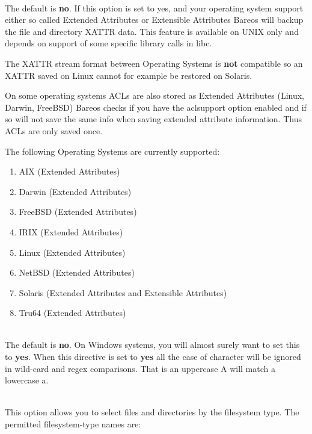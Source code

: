 \begin{description}
\label{XattrSupport}
\item [xattrsupport=yes{\textbar}no] \hfill \\
   The default is {\bf no}.  If this option is set to yes, and your
   operating system support either so called Extended Attributes or
   Extensible Attributes Bareos will backup the file and directory
   XATTR data. This feature is available on UNIX only and depends on
   support of some specific library calls in libc.

   The XATTR stream format between Operating Systems is {\bf not}
   compatible so an XATTR saved on Linux cannot for example be restored
   on Solaris.

   On some operating systems ACLs are also stored as Extended Attributes
   (Linux, Darwin, FreeBSD) Bareos checks if you have the aclsupport
   option enabled and if so will not save the same info when saving
   extended attribute information. Thus ACLs are only saved once.

   The following Operating Systems are currently supported:

   \begin{enumerate}
   \item AIX (Extended Attributes)
   \item Darwin (Extended Attributes)
   \item FreeBSD (Extended Attributes)
   \item IRIX (Extended Attributes)
   \item Linux (Extended Attributes)
   \item NetBSD (Extended Attributes)
   \item Solaris (Extended Attributes and Extensible Attributes)
   \item Tru64 (Extended Attributes)
   \end{enumerate}

\item [ignore case=yes{\textbar}no] \hfill \\
   The default is {\bf no}.  On Windows systems, you will almost surely
   want to set this to {\bf yes}.  When this directive is set to {\bf yes}
   all the case of character will be ignored in wild-card and regex
   comparisons.  That is an uppercase A will match a lowercase a.

\item [fstype=filesystem-type] \hfill \\
   This option allows you to select files and directories by the
   filesystem type.  The permitted filesystem-type names are:


\end{description}
